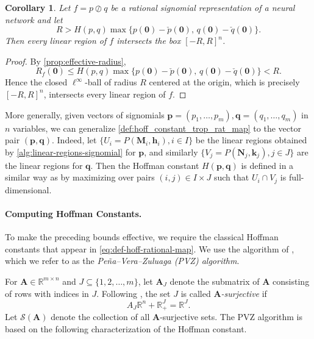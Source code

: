 \documentclass[10pt]{article}
\newtheorem{corollary}[theorem]{Corollary}
\theoremstyle{definition}
\theoremstyle{remark}
\newcommand{\RR}{{\mathbb{R}}}
\renewcommand{\vec}[1]{\mathbf{#1}}
\def\vp{{\vec{p}}}
\def\vq{{\vec{q}}}
\def\mA{{\bm{A}}}
\begin{document}
\begin{corollary}
Let $f = p \oslash q$ be a rational signomial representation of a neural network and let 
$$
R > H(p,q) \max \{ p(\mathbf 0) - \check p(\mathbf 0),\, q(\mathbf 0) - \check q(\mathbf 0) \}.
$$
Then every linear region of $f$ intersects the box $[-R,R]^n$.
\end{corollary}

\begin{proof}
By \cref{prop:effective-radius},
$$
R_f(\mathbf 0) \le H(p,q) \max\{p(\mathbf 0)- \check p(\mathbf 0),\, q(\mathbf 0) - \check q(\mathbf 0)\} < R.
$$
Hence the closed $\ell^\infty$-ball of radius $R$ centered at the origin, which is precisely $[-R,R]^n$, intersects every linear region of $f$.
\end{proof}

More generally, given vectors of signomials $\vp = (p_1, \dotsc, p_m), \vq =  (q_1, \dotsc, q_m)$ in $n$ variables, we can generalize \cref{def:hoff_constant_trop_rat_map} to the vector pair $(\vp,\vq)$. Indeed, let $\{U_i = P(\mathbf M_i, \mathbf h_i),i\in I\}$ be the linear regions obtained by \cref{alg:linear-regions-signomial} for $\vp$, and similarly $\{V_j = P(\mathbf N_j, \mathbf k_j),j\in J\}$ are the linear regions for $\vq$. Then the Hoffman constant $H(\vp,\vq)$ is defined in a similar way as  by maximizing over pairs $(i, j) \in I \times J$ such that $U_i \cap V_j$ is full-dimensional.

\paragraph{Computing Hoffman Constants.}\label{sec:theory-hoffman-computation} 

To make the preceding bounds effective, we require the classical Hoffman constants that appear in \cref{eq:def-hoff-rational-map}. We use the algorithm of \citet{pena2018algorithm}, which we refer to as the \emph{Pe\~{n}a--Vera--Zuluaga (PVZ) algorithm}.

For $\mA\in\mathbb{R}^{m\times n}$ and $J\subseteq \{1,2,\ldots,m\}$, let $\mA_J$ denote the submatrix of $\mA$ consisting of rows with indices in $J$. Following \citet{pena2018algorithm}, the set $J$ is called \emph{$\mA$-surjective} if
$$
    A_J \RR^n + \RR^J_+ = \RR^J.
$$
Let $\mathcal{S}(\mA)$ denote the collection of all $\mA$-surjective sets. The PVZ algorithm is based on the following characterization of the Hoffman constant.
\end{document}
